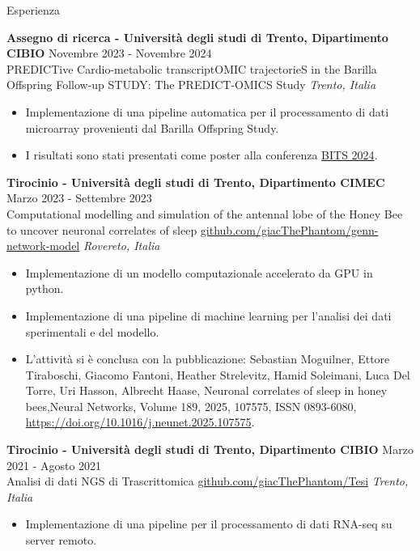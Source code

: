 \documentclass{resume} %
\begin{document}
\begin{rSection}{Esperienza}

\textbf{Assegno di ricerca - Universit\`a degli studi di Trento, Dipartimento CIBIO} \hfill Novembre 2023 - Novembre 2024\\
PREDICTive Cardio-metabolic transcriptOMIC trajectorieS in the Barilla Offspring Follow-up STUDY: The PREDICT-OMICS Study \hfill \textit{Trento, Italia}
 \begin{itemize}
    \itemsep -3pt {}
     \item Implementazione di una pipeline automatica per il processamento di dati microarray provenienti dal Barilla Offspring Study.
     \item I risultati sono stati presentati come poster alla conferenza \href{https://bioinformatics.it/bits2024/}{BITS 2024}.
 \end{itemize}

\textbf{Tirocinio - Universit\`a degli studi di Trento, Dipartimento CIMEC} \hfill Marzo 2023 - Settembre 2023\\
Computational modelling and simulation of the antennal lobe of the Honey Bee to uncover neuronal correlates of sleep \href{https://github.com/giacThePhantom/genn-network-model}{github.com/giacThePhantom/genn-network-model} \hfill \textit{Rovereto, Italia}
 \begin{itemize}
    \itemsep -3pt {}
     \item Implementazione di un modello computazionale accelerato da GPU in python.
     \item Implementazione di una pipeline di machine learning per l'analisi dei dati sperimentali e del modello.
     \item L'attivit\`a si \`e conclusa con la pubblicazione: Sebastian Moguilner, Ettore Tiraboschi, Giacomo Fantoni, Heather Strelevitz, Hamid Soleimani, Luca Del Torre, Uri Hasson, Albrecht Haase, Neuronal correlates of sleep in honey bees,Neural Networks, Volume 189, 2025, 107575, ISSN 0893-6080, \href{https://doi.org/10.1016/j.neunet.2025.107575}{https://doi.org/10.1016/j.neunet.2025.107575}.
 \end{itemize}

\textbf{Tirocinio - Universit\`a degli studi di Trento, Dipartimento CIBIO} \hfill Marzo 2021 - Agosto 2021\\
Analisi di dati NGS di Trascrittomica \href{https://github.com/giacThePhantom/Tesi}{github.com/giacThePhantom/Tesi} \hfill \textit{Trento, Italia}\\
 \begin{itemize}
    \itemsep -3pt {}
     \item Implementazione di una pipeline per il processamento di dati RNA-seq su server remoto.
 \end{itemize}


\end{rSection}
\end{document}
